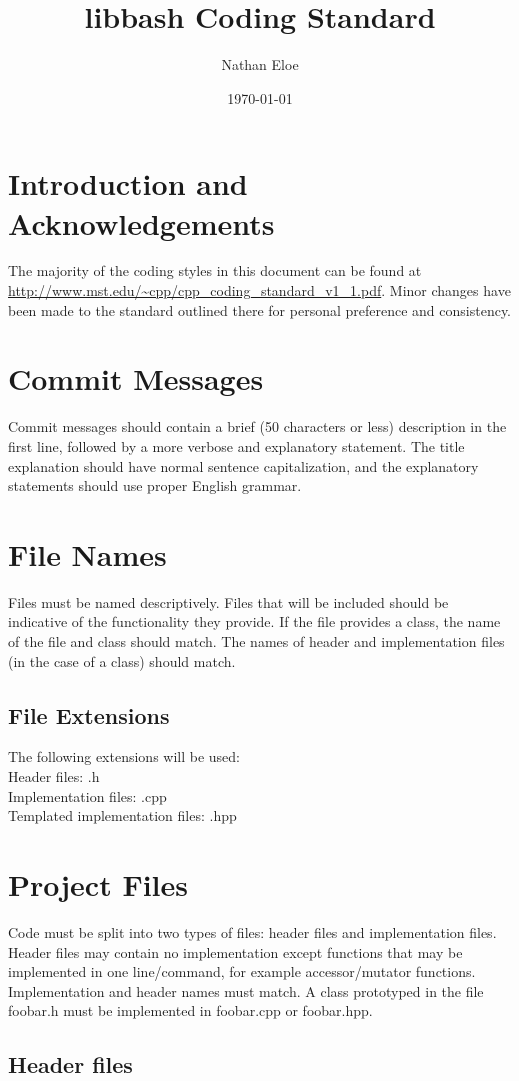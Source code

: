 \documentclass[letterpaper,10pt]{article}
\title{libbash Coding Standard}
\author{Nathan Eloe}
\date{\today}
\begin{document}
\maketitle
\section{Introduction and Acknowledgements}
The majority of the coding styles in this document can be found at \url{http://www.mst.edu/~cpp/cpp_coding_standard_v1_1.pdf}.  Minor changes have been made to the standard outlined there for personal preference and consistency.
\section{Commit Messages}
Commit messages should contain a brief (50 characters or less) description in the first line, followed by a more verbose and explanatory statement.  The title explanation should have normal sentence capitalization, and the explanatory statements should use proper English grammar.
\section{File Names}
Files must be named descriptively.  Files that will be included should be indicative of the functionality they provide.  If the file provides a class, the name of the file and class should match.  The names of header and implementation files (in the case of a class) should match.
\subsection{File Extensions}
The following extensions will be used:\\
Header files: .h\\
Implementation files: .cpp\\
Templated implementation files: .hpp
\section{Project Files}
Code must be split into two types of files: header files and implementation files.  Header files may contain no implementation except functions that may be implemented in one line/command, for example accessor/mutator functions.\\
Implementation and header names must match.  A class prototyped in the file foobar.h must be implemented in foobar.cpp or foobar.hpp.\\
\subsection{Header files}
\end{document}
